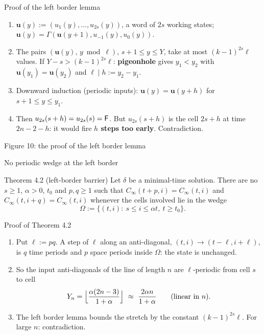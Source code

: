 \begin{frame}{Proof of the left border lemma}
\begin{enumerate}
\item $\mathbf u(y):=(u_1(y),\dots,u_{2s}(y))$, a word of $2s$ working states;\quad $\mathbf u(y)=\Gamma(\mathbf u(y+1),u_{-1}(y),u_0(y))$.
\item The pairs $(\mathbf u(y),\,y\bmod\ell)$, $s+1\le y\le Y$, take at most $(k-1)^{2s}\ell$ values. If $Y-s>(k-1)^{2s}\ell$: \textbf{pigeonhole} gives $y_1<y_2$ with $\mathbf u(y_1)=\mathbf u(y_2)$ and $\ell\mid h:=y_2-y_1$.
\item<2-> Downward induction (periodic inputs): $\mathbf u(y)=\mathbf u(y+h)$ for $s+1\le y\le y_1$.
\item<2-> Then $u_{2s}(s+h)=u_{2s}(s)=\mathsf F$. But $u_{2s}(s+h)$ is the cell $2s+h$ at time $2n-2-h$: it would fire \textbf{$h$ steps too early}. Contradiction.
\end{enumerate}
\end{frame}

\begin{frame}{Figure 10: the proof of the left border lemma}
\centering\fig[0.78]{}
\end{frame}

\begin{frame}{No periodic wedge at the left border}
\vspace{2ex}
\begin{statement}{Theorem 4.2 (left-border barrier)}
Let $\delta$ be a minimal-time solution. There are no $s\ge1$, $\alpha>0$, $t_0$ and $p,q\ge1$ such that $C_\infty(t+p,i)=C_\infty(t,i)$ and $C_\infty(t,i+q)=C_\infty(t,i)$ whenever the cells involved lie in the wedge
\[\Omega:=\{(t,i):\ s\le i\le\alpha t,\ t\ge t_0\}.\]
\end{statement}
\end{frame}

\begin{frame}{Proof of Theorem 4.2}
\begin{enumerate}
\item Put $\ell:=pq$. A step of $\ell$ along an anti-diagonal, $(t,i)\to(t-\ell,i+\ell)$, is $q$ time periods and $p$ space periods inside $\Omega$: the state is unchanged.
\item So the input anti-diagonals of the line of length $n$ are $\ell$-periodic from cell $s$ to cell
\[Y_n=\Bigl\lfloor\frac{\alpha(2n-3)}{1+\alpha}\Bigr\rfloor\ \approx\ \frac{2\alpha n}{1+\alpha}\qquad\text{(linear in $n$)}.\]
\item The left border lemma bounds the stretch by the constant $(k-1)^{2s}\ell$. For large $n$: contradiction.
\end{enumerate}
\end{frame}

